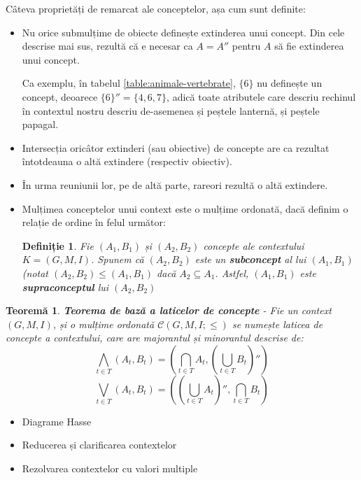 \documentclass[12pt, a4paper, twoside, romanian]{teza-upb}
\newtheorem{defn}{Definiție}
\newtheorem{theorem}{Teoremă}
\begin{document}
  Câteva proprietăți de remarcat ale conceptelor, așa cum sunt definite:
  \begin{itemize}
        \item Nu orice submulțime de obiecte definește extinderea unui concept. Din cele descrise mai sus, rezultă că e necesar ca $ A = A''$ pentru $A$ să fie extinderea unui concept.

        Ca exemplu, în tabelul \ref{table:animale-vertebrate}, $\{6\}$ nu definește un concept, deoarece $\{6\}'' = \{4, 6, 7\}$, adică toate atributele care descriu rechinul în contextul nostru descriu de-asemenea și peștele lanternă, și peștele papagal.
        \item Intersecția oricâtor extinderi (sau obiective) de concepte are ca rezultat întotdeauna o altă extindere (respectiv obiectiv).
        \item În urma reuniunii lor, pe de altă parte, rareori rezultă o altă extindere.
        \item Mulțimea conceptelor unui context este o mulțime ordonată, dacă definim o relație de ordine în felul următor:
          \begin{defn}
            Fie $(A_1, B_1)$ și $(A_2, B_2)$ concepte ale contextului $K = (G, M, I)$. Spunem că $(A_2, B_2)$ este un \textbf{subconcept} al lui $(A_1, B_1)$ (notat $(A_2, B_2) \le (A_1, B_1)$ dacă $A_2 \subseteq A_1$. Astfel, $(A_1, B_1)$ este \textbf{supraconceptul} lui $(A_2, B_2)$
          \end{defn}
  \end{itemize}

    \begin{theorem}
      \textbf{Teorema de bază a laticelor de concepte} - 
      Fie un context $(G, M, I)$, și o mulțime ordonată $\mathcal C \left(G, M, I; \le \right)$ se numește laticea de concepte a contextului, care are majorantul și minorantul descrise de:
      $$ \bigwedge_{t \in T}(A_t, B_t) = \left( \bigcap_{t \in T} A_t, \left( \bigcup_{t \in T} B_t \right)'' \right)$$
      $$ \bigvee_{t \in T} (A_t, B_t) = \left( \left( \bigcup_{t \in T} A_t \right)'', \bigcap_{ t \in T} B_t \right)$$
    \end{theorem}

  

    \begin{itemize}
      \item Diagrame Hasse
      \item Reducerea și clarificarea contextelor
      \item Rezolvarea contextelor cu valori multiple
    \end{itemize}
\end{document}
